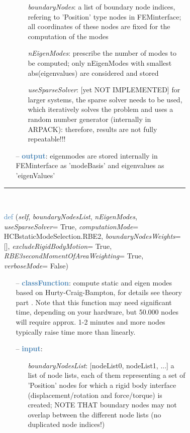 \begin{itemize}[leftmargin=1.4cm]
\begin{itemize}[leftmargin=1.4cm]
\begin{itemize}[leftmargin=0.5cm]
\begin{itemize}[leftmargin=1.4cm]
\begin{itemize}[leftmargin=1.4cm]
\begin{itemize}[leftmargin=0.5cm]
\begin{itemize}[leftmargin=0.7cm]
\begin{itemize}[leftmargin=1.2cm]
\setlength{\itemindent}{-0.7cm}
\item[]{\it boundaryNodes}: a list of boundary node indices, refering to 'Position' type nodes in FEMinterface; all coordinates of these nodes are fixed for the computation of the modes
\item[]{\it nEigenModes}: prescribe the number of modes to be computed; only nEigenModes with smallest abs(eigenvalues) are considered and stored
\item[]{\it useSparseSolver}: [yet NOT IMPLEMENTED] for larger systems, the sparse solver needs to be used, which iteratively solves the problem and uses a random number generator (internally in ARPACK): therefore, results are not fully repeatable!!!
\end{itemize}
\item[--]\textcolor{steelblue}{\bf output}: eigenmodes are stored internally in FEMinterface as 'modeBasis' and eigenvalues as 'eigenValues'
\vspace{12pt}\end{itemize}
%
\noindent\rule{8cm}{0.75pt}\vspace{1pt} \\ 
\begin{flushleft}
\noindent \textcolor{steelblue}{def {\bf {}}}\label{sec:FEM:FEMinterface:ComputeHurtyCraigBamptonModes}
({\it self}, {\it boundaryNodesList}, {\it nEigenModes}, {\it useSparseSolver}= True, {\it computationMode}= HCBstaticModeSelection.RBE2, {\it boundaryNodesWeights}= [], {\it excludeRigidBodyMotion}= True, {\it RBE3secondMomentOfAreaWeighting}= True, {\it verboseMode}= False)
\end{flushleft}
\setlength{\itemindent}{0.7cm}
\begin{itemize}[leftmargin=0.7cm]
\item[--]\textcolor{steelblue}{\bf classFunction}: compute static  and eigen modes based on Hurty-Craig-Bampton, for details see theory part . Note that this function may need significant time, depending on your hardware, but 50.000 nodes will require approx. 1-2 minutes and more nodes typically raise time more than linearly.
\item[--]\textcolor{steelblue}{\bf input}: \vspace{-6pt}
\begin{itemize}[leftmargin=1.2cm]
\setlength{\itemindent}{-0.7cm}
\item[]{\it boundaryNodesList}: [nodeList0, nodeList1, ...] a list of node lists, each of them representing a set of 'Position' nodes for which a rigid body interface (displacement/rotation and force/torque) is created; NOTE THAT boundary nodes may not overlap between the different node lists (no duplicated node indices!)

\end{itemize}
\end{itemize}
\end{itemize}
\end{itemize}
\end{itemize}
\end{itemize}
\end{itemize}
\end{itemize}
